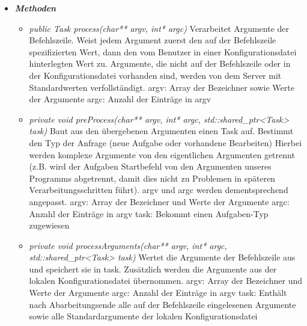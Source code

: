 \documentclass[a4paper,12pt]{article}
\begin{document}
\begin{itemize}[label={}]

	\item \textit{\textbf{Methoden}}
		\begin{itemize}[label={\textbullet}]
			\item \textit{public Task process(char** argv, int* argc)} Verarbeitet Argumente der Befehlszeile. Weist jedem Argument zuerst den auf der Befehlszeile spezifizierten Wert, dann den vom Benutzer in einer Konfigurationsdatei hinterlegten Wert zu. Argumente, die nicht auf der Befehlszeile oder in der Konfigurationsdatei vorhanden sind, werden von dem Server mit Standardwerten verfollständigt.\newline
			\newline
			argv: Array der Bezeichner sowie Werte der Argumente\newline
			argc: Anzahl der Einträge in argv


			\item \textit{private void preProcess(char** argv, int* argc, std::shared\_ptr<Task> task)}
			Baut aus den übergebenen Argumenten einen Task auf.\newline
			Bestimmt den Typ der Anfrage (neue Aufgabe oder vorhandene Bearbeiten)\newline
			Hierbei werden komplexe Argumente von den eigentlichen Argumenten getrennt (z.B. wird der Aufgaben 	Startbefehl von den Argumenten unseres Programms abgetrennt, damit dies nicht zu Problemen in späteren
			Verarbeitungsschritten führt).\newline
			argv und argc werden dementsprechend angepasst.\newline
			\newline
			argv: Array der Bezeichner und Werte der Argumente\newline
			argc: Anzahl der Einträge in argv\newline
			task: Bekommt einen Aufgaben-Typ zugewiesen


			\item \textit{private void processArguments(char** argv, int* argc, std::shared\_ptr<Task> task)}
			Wertet die Argumente der Befehlszeile aus und speichert sie in task.\newline
			Zusätzlich werden die Argumente aus der lokalen Konfigurationsdatei übernommen.\newline
			\newline
			argv: Array der Bezeichner und Werte der Argumente\newline
			argc: Anzahl der Einträge in argv\newline
			task: Enthält nach Abarbeitungsende alle auf der Befehlszeile eingelesenen Argumente sowie alle Standardargumente der lokalen Konfigurationsdatei


		\end{itemize}


\end{itemize}
\end{document}
